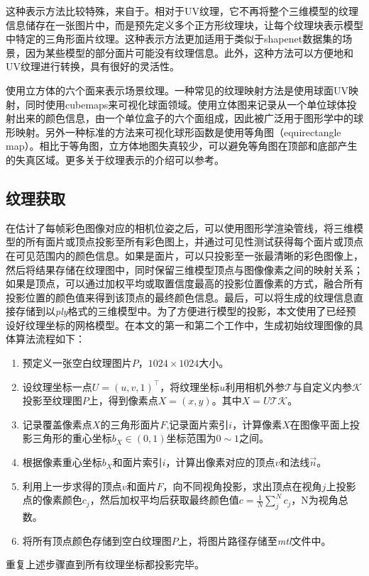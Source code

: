 \vspace*{2mm}这种表示方法比较特殊，来自于。相对于UV纹理，它不再将整个三维模型的纹理信息储存在一张图片中，而是预先定义多个正方形纹理块，让每个纹理块表示模型中特定的三角形面片纹理。这种表示方法更加适用于类似于shapenet数据集的场景，因为某些模型的部分面片可能没有纹理信息。此外，这种方法可以方便地和UV纹理进行转换，具有很好的灵活性。\par
\vspace*{2mm}使用立方体的六个面来表示场景纹理。一种常见的纹理映射方法是使用球面UV映射，同时使用cubemaps来可视化球面领域。使用立体图来记录从一个单位球体投射出来的颜色信息，由一个单位盒子的六个面组成，因此被广泛用于图形学中的球形映射。另外一种标准的方法来可视化球形函数是使用等角图（equirectangle map）。相比于等角图，立方体地图失真较少，可以避免等角图在顶部和底部产生的失真区域。更多关于纹理表示的介绍可以参考。\par
\subsection{纹理获取}
在估计了每帧彩色图像对应的相机位姿之后，可以使用图形学渲染管线，将三维模型的所有面片或顶点投影至所有彩色图上，并通过可见性测试获得每个面片或顶点在可见范围内的颜色信息。如果是面片，可以只投影至一张最清晰的彩色图像上，然后将结果存储在纹理图中，同时保留三维模型顶点与图像像素之间的映射关系；如果是顶点，可以通过加权平均或取置信度最高的投影位置像素的方式，融合所有投影位置的颜色值来得到该顶点的最终颜色信息。最后，可以将生成的纹理信息直接存储到以\emph{ply}格式的三维模型中。为了方便进行模型的投影，本文使用了已经预设好纹理坐标的网格模型。在本文的第一和第二个工作中，生成初始纹理图像的具体算法流程如下：\par



\begin{enumerate}[label=(\arabic*),leftmargin=\parindent,align=left,labelwidth=\parindent,labelsep=0pt]
    \item 预定义一张空白纹理图片$P$，$1024 \times 1024$大小。
    \item 设纹理坐标一点$U = (u,v,1)^\top$，将纹理坐标$u$利用相机外参$\mathcal{T}$与自定义内参$\mathcal{K}$投影至纹理图$P$上，得到像素点$X=(x,y)$。其中$X = U\mathcal{T}\mathcal{K}$。
    \item 记录覆盖像素点$X$的三角形面片$F$,记录面片索引$i$，计算像素$X$在图像平面上投影三角形的重心坐标$b_X\in(0,1)$坐标范围为$0 \sim 1$之间。
    \item 根据像素重心坐标$b_X$和面片索引$i$，计算出像素对应的顶点$v$和法线$\vec{n}$。
    \item 利用上一步求得的顶点$v$和面片$F$，向不同视角投影，求出顶点在视角$j$上投影点的像素颜色$c_j$，然后加权平均后获取最终颜色值$c= \frac{1}{N}  \sum_j^N c_j $，N为视角总数。
    \item 将所有顶点颜色存储到空白纹理图$P$上，将图片路径存储至\emph{mtl}文件中。
\end{enumerate}
重复上述步骤直到所有纹理坐标都投影完毕。 





